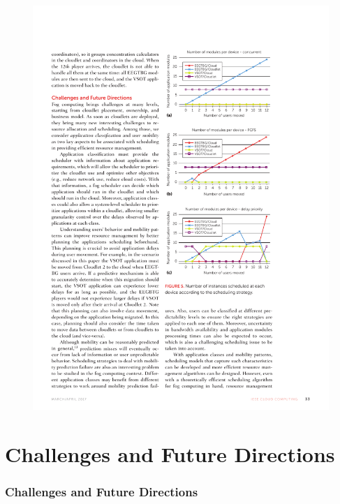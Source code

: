 \documentclass[10pt, pdf, xcolor=pdftex, dvipsnames, table]{beamer}
\begin{document}
\begin{frame}
 	\begin{figure}[htbp]
 		\centerline{\includegraphics[scale=1.2]{images/5c.pdf}}
 		\caption[]{}
 	\end{figure}
\end{frame}

\section[Challenges and Future Directions]{Challenges and Future Directions}

\begin{frame}
	\tableofcontents[currentsection]
\end{frame}

\begin{frame}
	\frametitle{Challenges and Future Directions}
\end{frame}
\end{document}
